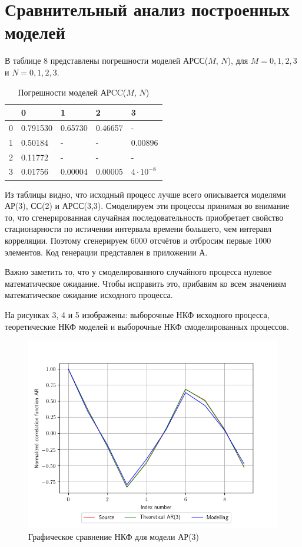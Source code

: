 \documentclass[12pt, fleqn]{article}
\begin{document}
{	\section{Сравнительный анализ построенных моделей}
	{
		В таблице 8 представлены погрешности моделей АРСС($M$, $N$), для $M = 0,1,2,3$ и $N = 0,1,2,3$.
		\begin{table}[H]
			\centering
			\caption{Погрешности моделей АРCC($M$, $N$)}
			\begin{tabularx}{0.8\textwidth}{ | Y | Y | Y | Y | Y | }
				\hline
				 & 0  & 1  & 2  & 3  \\               & 0.791530 & 0.65730 & 0.46657 & - \\               & 0.50184 & - & - & 0.00896  \\               & 0.11772 & - & - & - \\               & 0.01756 & 0.00004 & 0.00005 & $4\cdot10^{-8}$ \\ \hline  
			\end{tabularx}
		\end{table}
		Из таблицы видно, что исходный процесс лучше всего описывается моделями АР(3), СС(2) и АРСС(3,3). Смоделируем эти процессы принимая во внимание то, что сгенерированная случайная последовательность приобретает свойство стационарности по истичении интервала времени большего, чем интеравл корреляции. Поэтому сгенерируем $6000$ отсчётов и отбросим первые $1000$ элементов. Код генерации представлен в приложении А.
			  
		Важно заметить то, что у смоделированного случайного процесса нулевое математическое ожидание. Чтобы исправить это, прибавим ко всем значениям математическое ожидание исходного процесса.
			  
		На рисунках 3, 4 и 5 изображены: выборочные НКФ исходного процесса, теоретические НКФ моделей и выборочные НКФ смоделированных процессов.
			  
		\begin{figure}[H]
			\includegraphics{plot_ar_ncf.png}
			\caption{Графическое сравнение НКФ для модели АР(3)}
		\end{figure}
		  	
}}
\end{document}
